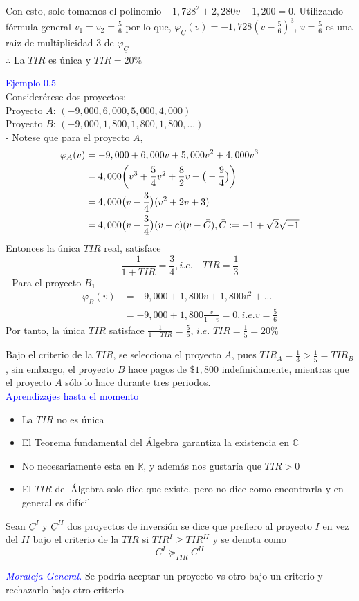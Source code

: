 Con esto, solo tomamos el polinomio $-1,728^2 + 2,280v-1,200=0$. Utilizando fórmula general $v_1=v_2=\frac{5}{6}$ por lo que, $\varphi_{\underline{C}}(v) = -1,728(v-\frac{5}{6})^3$, $v=\frac{5}{6}$ es una raiz de multiplicidad $3$ de $\varphi_{\underline{C}}$\\
$\therefore$ La $TIR$ es única y $TIR = 20\%$

\textcolor{blue}{Ejemplo 0.5}\\
Considerérese dos proyectos:\\
Proyecto $A$: $(-9,000,6,000,5,000,4,000)$\\
Proyecto $B$: $(-9,000,1,800,1,800,1,800,...)$\\
- Notese que para el proyecto $A$,
\begin{align*}
    \varphi_A(v) &= -9,000+6,000v+5,000v^2+4,000v^3\\
    &= 4,000\bigg(v^3+\frac{5}{4}v^2+\frac{8}{2}v +\big(-\frac{9}{4}\big)\bigg)\\
    &= 4,000\big(v-\frac{3}{4}\big)(v^2+2v+3)\\
    &= 4,000\big(v-\frac{3}{4}\big)(v-c)(v-\Bar{C}),\Bar{C}:=-1+\sqrt{2}\sqrt{-1}
\end{align*}
Entonces la única $TIR$ real, satisface
$$\frac{1}{1+TIR} = \frac{3}{4}, i.e.\quad TIR=\frac{1}{3}$$
- Para el proyecto $B_1$
\begin{align*}
    \varphi_B(v) &= - 9,000 + 1,800v + 1,800v^2+...\\
    &= -9,000+1,800\frac{v}{1-v} =0, i.e. v=\frac{5}{6}
\end{align*}
Por tanto, la única $TIR$ satisface $\frac{1}{1+TIR}=\frac{5}{6}$, $i.e.$ $TIR=\frac{1}{5}=20\%$

Bajo el criterio de la $TIR$, se selecciona el proyecto $A$, pues $TIR_A=\frac{1}{3}>\frac{1}{5}=TIR_B$, sin embargo, el proyecto $B$ hace pagos de $\$1,800$ indefinidamente, mientras que el proyecto $A$ sólo lo hace durante tres periodos.\\

\textcolor{blue}{Aprendizajes hasta el momento}\\
\begin{itemize}
    \item La $TIR$ no es única
    \item El Teorema fundamental del Álgebra garantiza la existencia en $\mathbb{C}$
    \item No necesariamente esta en $\mathbb{R}$, y además nos gustaría que $TIR>0$
    \item El $TIR$ del Álgebra solo dice que existe, pero no dice como encontrarla y en general es difícil
\end{itemize}
\begin{definition}
Sean $\underline{C}^I$ y $\underline{C}^{II}$ dos proyectos de inversión se dice que prefiero al proyecto $I$ en vez del $II$ bajo el criterio de la $TIR$ si $TIR^I \geq TIR^{II}$ y se denota como
$$\underline{C}^I \succeq_{TIR} \underline{C}^{II}$$
\end{definition}
\textcolor{blue}{\textit{Moraleja General.}} Se podría aceptar un proyecto vs otro bajo un criterio y rechazarlo bajo otro criterio

